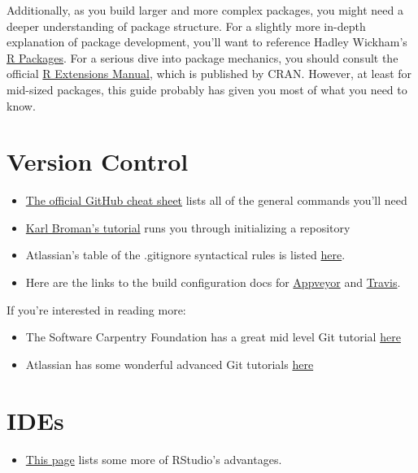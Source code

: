 \documentclass[
]{book}
\providecommand{\tightlist}{%
  \setlength{\itemsep}{0pt}\setlength{\parskip}{0pt}}
\begin{document}
Additionally, as you build larger and more complex packages, you might need a deeper understanding of package structure. For a slightly more in-depth explanation of package development, you'll want to reference Hadley Wickham's \href{http://r-pkgs.had.co.nz/}{R Packages}. For a serious dive into package mechanics, you should consult the official \href{https://cran.r-project.org/doc/manuals/R-exts.html\#Creating-R-packages}{R Extensions Manual}, which is published by CRAN. However, at least for mid-sized packages, this guide probably has given you most of what you need to know.

\hypertarget{version-control}{%
\section{Version Control}\label{version-control}}

\begin{itemize}
\tightlist
\item
  \href{https://github.github.com/training-kit/downloads/github-git-cheat-sheet.pdf}{The official GitHub cheat sheet} lists all of the general commands you'll need
\item
  \href{http://kbroman.org/github_tutorial/pages/init.html}{Karl Broman's tutorial} runs you through initializing a repository
\item
  Atlassian's table of the .gitignore syntactical rules is listed \href{https://www.atlassian.com/git/tutorials/gitignore}{here}.
\item
  Here are the links to the build configuration docs for \href{https://www.appveyor.com/docs/build-configuration/}{Appveyor} and \href{https://docs.travis-ci.com/user/languages/r/}{Travis}.
\end{itemize}

If you're interested in reading more:

\begin{itemize}
\tightlist
\item
  The Software Carpentry Foundation has a great mid level Git tutorial \href{https://swcarpentry.GitHub.io/git-novice/}{here}
\item
  Atlassian has some wonderful advanced Git tutorials \href{https://www.atlassian.com/git/tutorials/advanced-overview}{here}
\end{itemize}

\hypertarget{ides}{%
\section{IDEs}\label{ides}}

\begin{itemize}
\tightlist
\item
  \href{https://www.theanalysisfactor.com/the-advantages-of-rstudio/}{This page} lists some more of RStudio's advantages.
\end{itemize}
\end{document}
